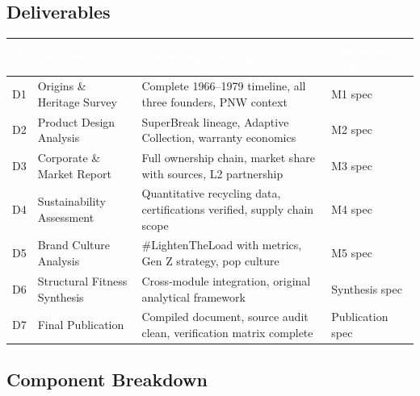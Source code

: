 \documentclass[11pt,letterpaper]{article}
\newcommand{\tableheader}[1]{\textbf{\sffamily\textcolor{white}{#1}}}
\begin{document}
\subsection{Deliverables}

\begin{center}
\begin{tabularx}{\textwidth}{C{0.6cm}L{3.5cm}XL{3cm}}
\toprule
{}
\tableheader{\#} & \tableheader{Deliverable} & \tableheader{Acceptance Criteria} & \tableheader{Component Spec} \\
\midrule
D1 & Origins \& Heritage Survey & Complete 1966--1979 timeline, all three founders, PNW context & M1 spec \\
D2 & Product Design Analysis & SuperBreak lineage, Adaptive Collection, warranty economics & M2 spec \\
D3 & Corporate \& Market Report & Full ownership chain, market share with sources, L2 partnership & M3 spec \\
D4 & Sustainability Assessment & Quantitative recycling data, certifications verified, supply chain scope & M4 spec \\
D5 & Brand Culture Analysis & \#LightenTheLoad with metrics, Gen Z strategy, pop culture & M5 spec \\
D6 & Structural Fitness Synthesis & Cross-module integration, original analytical framework & Synthesis spec \\
D7 & Final Publication & Compiled document, source audit clean, verification matrix complete & Publication spec \\
\bottomrule
\end{tabularx}
\end{center}

\subsection{Component Breakdown}
\end{document}
